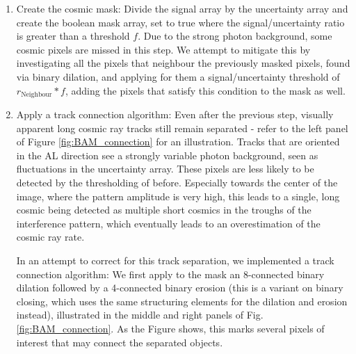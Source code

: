 \documentclass[a4paper, 11pt]{article}
\begin{document}
\begin{enumerate}
  \item Create the cosmic mask: Divide the signal array by the uncertainty array and create the boolean mask array, set to true where the signal/uncertainty ratio is greater than a threshold $f$. Due to the strong photon background, some cosmic pixels are missed in this step. We attempt to mitigate this by investigating all the pixels that neighbour the previously masked pixels, found via binary dilation, and applying for them a signal/uncertainty threshold of $r_\mathrm{Neighbour}*f$, adding the pixels that satisfy this condition to the mask as well.
  \item \label{item:connectAlg} Apply a track connection algorithm: Even after the previous step, visually apparent long cosmic ray tracks still remain separated - refer to the left panel of Figure \ref{fig:BAM_connection} for an illustration. Tracks that are oriented in the AL direction see a strongly variable photon background, seen as fluctuations in the uncertainty array. These pixels are less likely to be detected by the thresholding of before. Especially towards the center of the image, where the pattern amplitude is very high, this leads to a single, long cosmic being detected as multiple short cosmics in the troughs of the interference pattern, which eventually leads to an overestimation of the cosmic ray rate.

    In an attempt to correct for this track separation, we implemented a track connection algorithm: We first apply to the mask an 8-connected binary dilation followed by a 4-connected binary erosion (this is a variant on binary closing, which uses the same structuring elements for the dilation and erosion instead), illustrated in the middle and right panels of Fig. \ref{fig:BAM_connection}. As the Figure shows, this marks several pixels of interest that may connect the separated objects.


\end{enumerate}
\end{document}
